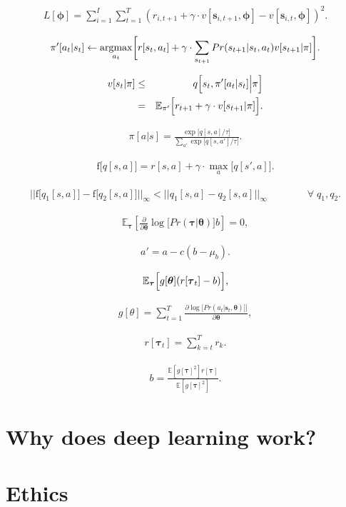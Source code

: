 \documentclass[letterpaper,twoside,openany, titlepage,oldfontcommands,titles,dvipsnames]{memoir}
\begin{document}
\begin{eqnarray}
 L[\boldsymbol\phi] = \sum_{i=1}^{I}\sum_{t=1}^{T}\left(r_{i,t+1} + \gamma \cdot v[\mathbf{s}_{i,t+1},\boldsymbol\phi]- v[\mathbf{s}_{i,t},\boldsymbol\phi] \right)^2.
 \end{eqnarray}

\begin{eqnarray}
 \pi'[a_t|s_t] \leftarrow \mathop{\rm argmax}_{a_t}\biggl[r[s_t,a_t]+\gamma \cdot \sum_{s_{t+1}} Pr(s_{t+1}|s_t,a_t)v[s_{t+1}|\pi]\biggr].
 \end{eqnarray}

\begin{eqnarray}
 v[s_t|\pi] &\leq& q\Bigl[s_t,\pi'[a_{t}|s_{t}]\Bigl|\pi\Bigr]\nonumber\\
 &=& \mathbb{E}_{\pi'}\Bigl[r_{t+1} + \gamma\cdot v[s_{t+1}|\pi]\Bigr].
 \end{eqnarray}

\begin{eqnarray}
 \pi[a|s] = \frac{\exp\bigl[q[s,a]/\tau\bigr]}{\sum_{a'}\exp\bigl[q[s,a']/\tau\bigr]}.
 \end{eqnarray}

\begin{eqnarray}
 \mbox{f}\bigl[q[s,a]\bigr] =r[s,a]+\gamma \cdot \max_{a}\bigl[q[s',a]\bigr].
 \end{eqnarray}

\begin{eqnarray}
 \biggl|\biggr|\mbox{f}\bigl[q_1[s,a]\bigr]-\mbox{f}\bigl[q_2[s,a]\bigr]\biggl|\biggr|_{\infty} < 
  \biggl|\biggr|q_1[s,a]- q_2[s,a]\biggl|\biggr|_\infty\quad\quad\quad\quad \forall\; q_1,q_2.
 \end{eqnarray}


\begin{eqnarray}
 \mathbb{E}_{\boldsymbol\tau}\left[\frac{\partial}{\partial \boldsymbol\theta} \log\bigl[Pr(\boldsymbol\tau|\boldsymbol\theta)\bigr] b \right]= 0,
 \end{eqnarray}



\begin{eqnarray}
  a' = a - c(b-\mu_b).
 \end{eqnarray}

\begin{eqnarray}
 \mathbb{E}_{\boldsymbol\tau}\Bigl[g[\boldsymbol\theta](r[\boldsymbol\tau_t]-b)\Bigr],
 \end{eqnarray}

\begin{eqnarray}
  g[\theta] = \sum_{t=1}^{T} \frac{\partial\log\bigl[Pr(a_{t}|\mathbf{s}_{t},\boldsymbol\theta)]\bigr]}{\partial \boldsymbol\theta}, 
 \end{eqnarray}

\begin{eqnarray}
 r[\boldsymbol\tau_t] = \sum_{k=t}^{T}r_k.
 \end{eqnarray}

\begin{eqnarray}
 b = \frac{\mathbb{E}[g[\boldsymbol\tau]^2]r[\boldsymbol\tau]}{\mathbb{E}[g[\boldsymbol\tau]^2]}.
 \end{eqnarray}


\chapter{Why does deep learning work?}


\chapter{Ethics}
\end{document}
